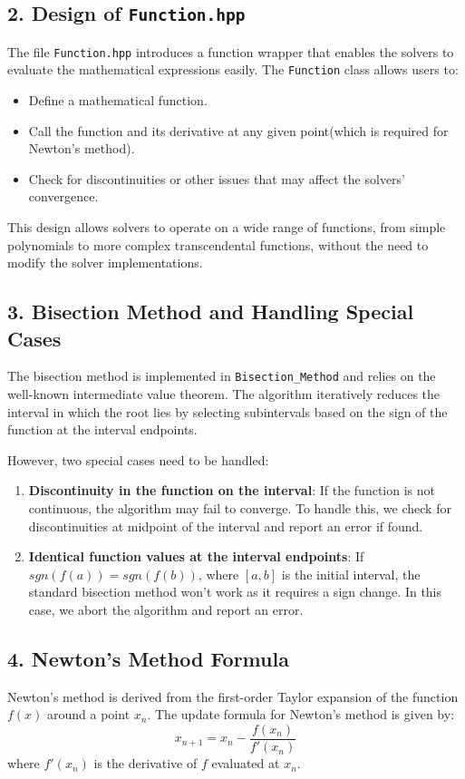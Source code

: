 \documentclass[a4paper]{article}
\begin{document}
\subsection*{2. Design of \texttt{Function.hpp}}
The file \texttt{Function.hpp} introduces a function wrapper that enables the solvers to evaluate the mathematical expressions easily. The \texttt{Function} class allows users to:
\begin{itemize}
    \item Define a mathematical function.
    \item Call the function and its derivative at any given point(which is required for Newton's method).
    \item Check for discontinuities or other issues that may affect the solvers' convergence.
\end{itemize}

This design allows solvers to operate on a wide range of functions, from simple polynomials to more complex transcendental functions, without the need to modify the solver implementations.

\subsection*{3. Bisection Method and Handling Special Cases}
The bisection method is implemented in \texttt{Bisection\_Method} and relies on the well-known intermediate value theorem. The algorithm iteratively reduces the interval in which the root lies by selecting subintervals based on the sign of the function at the interval endpoints.

However, two special cases need to be handled:
\begin{enumerate}
    \item \textbf{Discontinuity in the function on the interval}: If the function is not continuous, the algorithm may fail to converge. To handle this, we check for discontinuities at midpoint of the interval and report an error if found.
    \item \textbf{Identical function values at the interval endpoints}: If \( sgn(f(a)) = sgn(f(b)) \), where \( [a, b] \) is the initial interval, the standard bisection method won't work as it requires a sign change. In this case, we abort the algorithm and report an error.
\end{enumerate}

\subsection*{4. Newton's Method Formula}
Newton's method is derived from the first-order Taylor expansion of the function \( f(x) \) around a point \( x_n \). The update formula for Newton's method is given by:
\[
x_{n+1} = x_n - \frac{f(x_n)}{f'(x_n)}
\]
where \( f'(x_n) \) is the derivative of \( f \) evaluated at \( x_n \).
\end{document}
